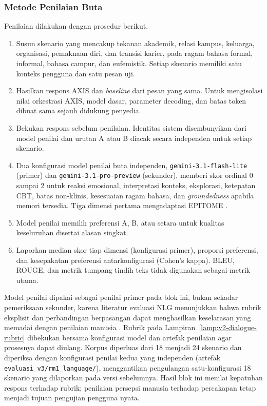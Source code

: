 \subsubsection{Metode Penilaian Buta}

Penilaian dilakukan dengan prosedur berikut.

\begin{enumerate}[label=\arabic*.,leftmargin=*,itemsep=3pt]
  \item Susun skenario yang mencakup tekanan akademik, relasi kampus, keluarga, organisasi, pemaknaan diri, dan transisi karier, pada ragam bahasa formal, informal, bahasa campur, dan eufemistik. Setiap skenario memiliki satu konteks pengguna dan satu pesan uji.
  \item Hasilkan respons AXIS dan \textit{baseline} dari pesan yang sama. Untuk mengisolasi nilai orkestrasi AXIS, model dasar, parameter decoding, dan batas token dibuat sama sejauh didukung penyedia.
  \item Bekukan respons sebelum penilaian. Identitas sistem disembunyikan dari model penilai dan urutan A atau B diacak secara independen untuk setiap skenario.
  \item Dua konfigurasi model penilai buta independen, \texttt{gemini-3.1-flash-lite} (primer) dan \texttt{gemini-3.1-pro-preview} (sekunder), memberi skor ordinal 0 sampai 2 untuk reaksi emosional, interpretasi konteks, eksplorasi, ketepatan CBT, batas non-klinis, kesesuaian ragam bahasa, dan \textit{groundedness} apabila memori tersedia. Tiga dimensi pertama mengadaptasi EPITOME \parencite{sharma2020epitome}.
  \item Model penilai memilih preferensi A, B, atau setara untuk kualitas keseluruhan disertai alasan singkat.
  \item Laporkan median skor tiap dimensi (konfigurasi primer), proporsi preferensi, dan kesepakatan preferensi antarkonfigurasi (Cohen's kappa). BLEU, ROUGE, dan metrik tumpang tindih teks tidak digunakan sebagai metrik utama.
\end{enumerate}

Model penilai dipakai sebagai penilai primer pada blok ini, bukan sekadar pemeriksaan sekunder, karena literatur evaluasi NLG menunjukkan bahwa rubrik eksplisit dan perbandingan berpasangan dapat menghasilkan keselarasan yang memadai dengan penilaian manusia \parencite{liu2023geval,zheng2023judging}. Rubrik pada Lampiran~\ref{lamp:v2-dialogue-rubric} dibekukan bersama konfigurasi model dan artefak penilaian agar prosesnya dapat diulang. Korpus diperluas dari 18 menjadi 24 skenario dan diperiksa dengan konfigurasi penilai kedua yang independen (artefak \texttt{evaluasi\_v3/rm1\_language/}), menggantikan pengulangan satu-konfigurasi 18 skenario yang dilaporkan pada versi sebelumnya. Hasil blok ini menilai kepatuhan respons terhadap rubrik; penilaian persepsi manusia terhadap percakapan tetap menjadi tujuan pengujian pengguna nyata.

